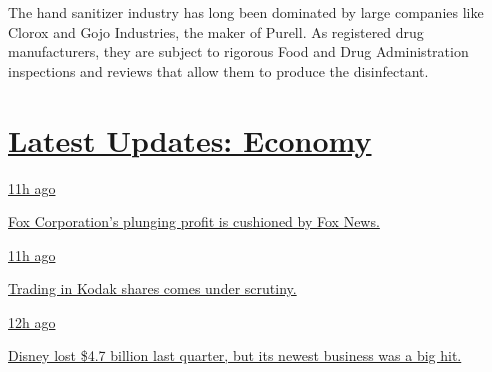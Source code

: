 The hand sanitizer industry has long been dominated by large companies
like Clorox and Gojo Industries, the maker of Purell. As registered drug
manufacturers, they are subject to rigorous Food and Drug Administration
inspections and reviews that allow them to produce the disinfectant.

\hypertarget{latest-updates-economy}{%
\section{\texorpdfstring{\href{https://www.nytimes3xbfgragh.onion/live/2020/08/04/business/stock-market-today-coronavirus?action=click\&pgtype=Article\&state=default\&region=MAIN_CONTENT_1\&context=storylines_live_updates}{Latest
Updates:
Economy}}{Latest Updates: Economy}}\label{latest-updates-economy}}

\href{https://www.nytimes3xbfgragh.onion/live/2020/08/04/business/stock-market-today-coronavirus?action=click\&pgtype=Article\&state=default\&region=MAIN_CONTENT_1\&context=storylines_live_updates\#fox-corporations-plunging-profit-is-cushioned-by-fox-news}{11h
ago}

\href{https://www.nytimes3xbfgragh.onion/live/2020/08/04/business/stock-market-today-coronavirus?action=click\&pgtype=Article\&state=default\&region=MAIN_CONTENT_1\&context=storylines_live_updates\#fox-corporations-plunging-profit-is-cushioned-by-fox-news}{Fox
Corporation's plunging profit is cushioned by Fox News.}

\href{https://www.nytimes3xbfgragh.onion/live/2020/08/04/business/stock-market-today-coronavirus?action=click\&pgtype=Article\&state=default\&region=MAIN_CONTENT_1\&context=storylines_live_updates\#trading-in-kodak-shares-comes-under-scrutiny}{11h
ago}

\href{https://www.nytimes3xbfgragh.onion/live/2020/08/04/business/stock-market-today-coronavirus?action=click\&pgtype=Article\&state=default\&region=MAIN_CONTENT_1\&context=storylines_live_updates\#trading-in-kodak-shares-comes-under-scrutiny}{Trading
in Kodak shares comes under scrutiny.}

\href{https://www.nytimes3xbfgragh.onion/live/2020/08/04/business/stock-market-today-coronavirus?action=click\&pgtype=Article\&state=default\&region=MAIN_CONTENT_1\&context=storylines_live_updates\#disney-lost-4-7-billion-last-quarter-but-its-newest-business-was-a-big-hit}{12h
ago}

\href{https://www.nytimes3xbfgragh.onion/live/2020/08/04/business/stock-market-today-coronavirus?action=click\&pgtype=Article\&state=default\&region=MAIN_CONTENT_1\&context=storylines_live_updates\#disney-lost-4-7-billion-last-quarter-but-its-newest-business-was-a-big-hit}{Disney
lost \$4.7 billion last quarter, but its newest business was a big hit.}

